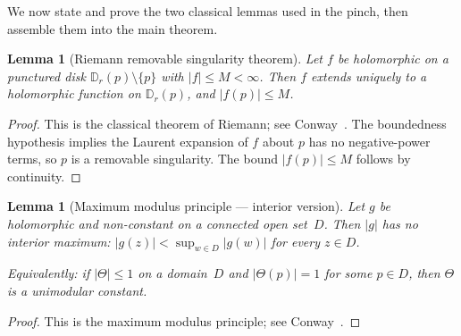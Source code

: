 \documentclass[11pt]{amsart}
\newtheorem{lemma}[theorem]{Lemma}
\theoremstyle{definition}
\theoremstyle{remark}
\newcommand{\D}{\mathbb{D}}
\begin{document}
We now state and prove the two classical lemmas used in the pinch,
then assemble them into the main theorem.

\begin{lemma}[Riemann removable singularity theorem]\label{lem:removable}
Let $f$ be holomorphic on a punctured disk $\D_r(p)\setminus\{p\}$
with $|f|\le M<\infty$.  Then $f$ extends uniquely to a holomorphic
function on $\D_r(p)$, and $|f(p)|\le M$.
\end{lemma}
\begin{proof}
This is the classical theorem of Riemann; see Conway~\cite[\S III.2.1]{ConwayII}.
The boundedness hypothesis implies the Laurent expansion of $f$ about $p$
has no negative-power terms, so $p$ is a removable singularity.
The bound $|f(p)|\le M$ follows by continuity.
\end{proof}

\begin{lemma}[Maximum modulus principle --- interior version]
\label{lem:mmp}
Let $g$ be holomorphic and non-constant on a connected open set~$D$.
Then $|g|$ has no interior maximum: $|g(z)|<\sup_{w\in D}|g(w)|$ for
every $z\in D$.

Equivalently: if $|\Theta|\le 1$ on a domain~$D$ and $|\Theta(p)|=1$
for some $p\in D$, then $\Theta$ is a unimodular constant.
\end{lemma}
\begin{proof}
This is the maximum modulus principle; see Conway~\cite[\S V.3.2]{ConwayII}.
\end{proof}
\end{document}
